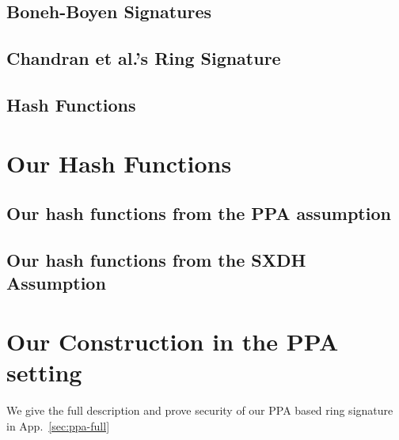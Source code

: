 \documentclass{llncs}
\begin{document}
		

	\subsection{Boneh-Boyen Signatures} \label{sec:bbs}
    
            

      	\subsection{Chandran et al.'s Ring Signature} \label{sec:chan-rs}
	
       		

	\subsection{Hash Functions} \label{sec:hash}

		

    \section{Our Hash Functions} \label{sec:hf}
    
    	
    	
    	\subsection{Our hash functions from the PPA assumption} \label{sec:hf-ppa}
    	
    		

	\subsection{Our hash functions from the SXDH Assumption} \label{sec:hf-sxdh}

		

	
	
	\section{Our Construction in the PPA setting}
	
		
    	
		We give the full description and prove security of our PPA based ring signature in App.~\ref{sec:ppa-full}
\end{document}
